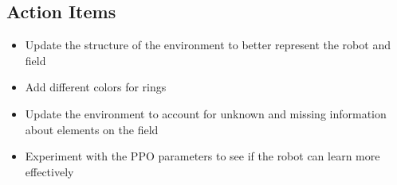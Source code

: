 \subsection{Action Items}
\begin{itemize}
    \item Update the structure of the environment to better represent the robot and field
    \item Add different colors for rings
    \item Update the environment to account for unknown and missing information about elements on the field
    \item Experiment with the PPO parameters to see if the robot can learn more effectively
\end{itemize}